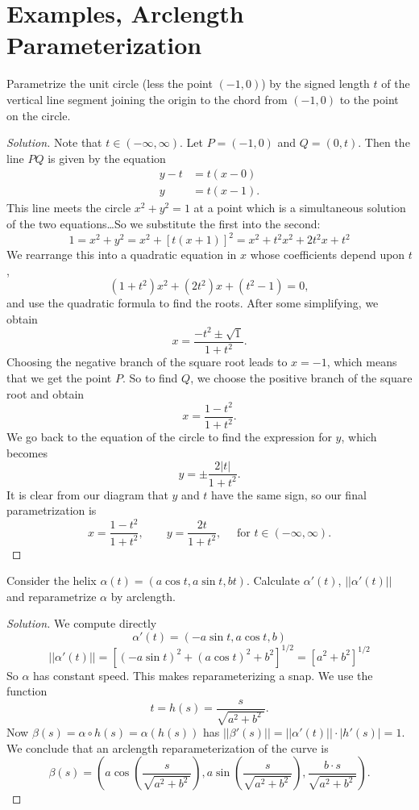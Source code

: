 \documentclass[Shifrin_Solutions_Spring_2018]{subfiles}
\begin{document}
\section{Examples, Arclength Parameterization}

\begin{exercise}
Parametrize the unit circle (less the point $(-1,0)$)  by the signed length $t$
of the vertical line segment joining the origin to the chord from $(-1,0)$ to
the point on the circle.
\end{exercise}

\begin{proof}[Solution]
Note that $t \in (-\infty, \infty)$. Let $P = (-1,0)$ and $Q = (0,t)$. Then the
line $PQ$ is given by the equation
\[
\begin{split}
y-t &= t ( x - 0) \\
 y & = t ( x-1).
\end{split}
\]
This line meets the circle $x^2  + y^2 = 1$ at a point which is a simultaneous
solution of the two equations\dots So we substitute the first into the second:
\[
1 = x^2 + y^2 = x^2 + [t(x+1)]^2 = x^2 + t^2x^2 + 2t^2x + t^2
\]
We rearrange this into a quadratic equation in $x$ whose coefficients depend
upon $t$,
\[
(1+t^2) x^2 + (2t^2) x + (t^2 - 1) = 0,
\]
and use the quadratic formula to find the roots. After some simplifying, we
obtain
\[
x = \dfrac{-t^2 \pm \sqrt{1}}{1+t^2}.
\]
Choosing the negative branch of the square root leads to $x=-1$, which means
that we get the point $P$. So to find $Q$, we choose the positive branch of the
square root and obtain
\[
x = \dfrac{1-t^2}{1+t^2}.
\]
We go back to the equation of the circle to find the expression for $y$, which
becomes
\[
y =\pm \dfrac{ 2|t|}{1+t^2}.
\]
It is clear from our diagram that $y$ and $t$ have the same sign, so our final
parametrization is
\[
x = \dfrac{1-t^2}{1+t^2}, \qquad y = \dfrac{ 2t}{1+t^2}, \quad \mbox{ for } t
\in (-\infty, \infty) .
\]
\end{proof}

\vfill
\pagebreak


\begin{exercise}
Consider the helix $\alpha(t) = ( a \cos t , a \sin t , b t )$. Calculate
$\alpha'(t)$,
$||\alpha'(t)||$ and reparametrize $\alpha$ by arclength.
\end{exercise}

\begin{proof}[Solution] We compute directly
\[
\alpha'(t) = ( - a \sin t, a \cos t , b)
\]
\[
||\alpha'(t)|| = [ (-a\sin t)^2 + (a \cos t)^2 + b^2]^{1/2} = [a^2+b^2]^{1/2}
\]
So $\alpha$ has constant speed. This makes reparameterizing a snap. We use the
function
\[
t = h(s) = \dfrac{s}{\sqrt{a^2 + b^2 \ }}.
\]
Now $\beta(s) = \alpha \circ h(s) = \alpha(h(s))$ has $||\beta'(s)|| =
||\alpha'(t)||\cdot |h'(s)| = 1$.
We conclude that an arclength reparameterization of the curve is
\[
\beta(s) = \left( a \cos \left(\dfrac{s}{\sqrt{a^2 + b^2 \ }}\right) , a
\sin\left( \dfrac{s}{\sqrt{a^2 + b^2 \ }}\right) , \dfrac{b \cdot s}{\sqrt{a^2
+ b^2 \ }} \right).
\]
\end{proof}
\end{document}

